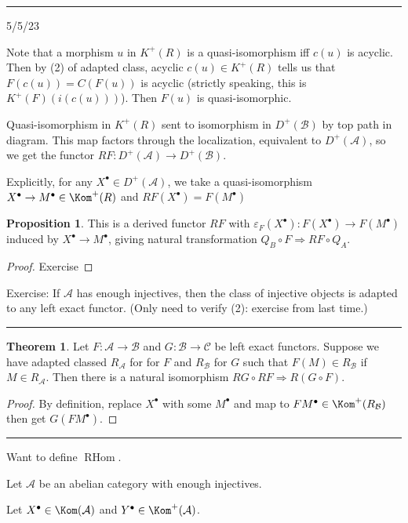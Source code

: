 \documentclass[12pt]{article}
\newcommand{\sepline}{\rule{\textwidth}{0.4pt}}
\theoremstyle{definition}
\newtheorem{theorem}{Theorem}
\newtheorem{proposition}{Proposition}
\renewcommand{\AA}{\mathcal{A}}
\newcommand{\BB}{\mathcal{B}}
\newcommand{\CC}{\mathcal{C}}
\newcommand{\eps}{\varepsilon}
\newcommand{\<}{\left\langle}
\renewcommand{\>}{\right\rangle}
\DeclareMathOperator{\RHom}{RHom}
\renewcommand{\_}[1]{{_{#1}}}
\begin{document}
\sepline

5/5/23

Note that a morphism $u$ in $K^+(R)$ is a quasi-isomorphism iff $c(u)$ is acyclic.
Then by (2) of adapted class, acyclic $c(u) \in K^+(R)$ tells us that $F(c(u)) = C(F(u))$ is acyclic (strictly speaking, this is $K^+(F)(i(c(u)))$).
Then $F(u)$ is quasi-isomorphic.

Quasi-isomorphism in $K^+(R)$ sent to isomorphism in $D^+(\BB)$ by top path in diagram.
This map factors through the localization, equivalent to $D^+(\AA)$, so we get the functor $RF : D^+(\AA) \to D^+(\BB)$.

Explicitly, for any $X^\bullet \in D^+(\AA)$, we take a quasi-isomorphism $X^\bullet \to M^\bullet \in \Kom^+(R)$ and $RF(X^\bullet) = F(M^\bullet)$

\begin{proposition}
    This is a derived functor $RF$ with $\eps_F(X^\bullet) : F(X^\bullet) \to F(M^\bullet)$ induced by $X^\bullet \to M^\bullet$, giving natural transformation $Q_B \circ F \Rightarrow RF \circ Q_A$.
\end{proposition}

\begin{proof}
    Exercise
\end{proof}

Exercise: If $\AA$ has enough injectives, then the class of injective objects is adapted to any left exact functor. 
(Only need to verify (2): exercise from last time.)

\sepline

\begin{theorem}
    Let $F : \AA \to \BB$ and $G : \BB \to \CC$ be left exact functors.
    Suppose we have adapted classed $R_\AA$ for for $F$ and $R_\BB$ for $G$ such that $F(M) \in R_\BB$ if $M \in R_\AA$.
    Then there is a natural isomorphism $RG \circ RF \Rightarrow R(G \circ F)$.
\end{theorem}

\begin{proof}
    By definition, replace $X^\bullet$ with some $M^\bullet$ and map to $FM^\bullet \in \Kom^+(R_\BB)$ then get $G(FM^\bullet)$.
\end{proof}

\sepline

Want to define $\RHom$.

Let $\AA$ be an abelian category with enough injectives.

Let $X^\bullet \in \Kom(\AA)$ and $Y^\bullet \in \Kom^+(\AA)$.
\end{document}
